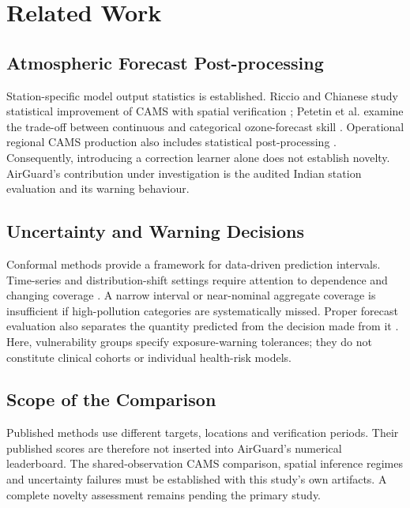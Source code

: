 \section{Related Work}
\subsection{Atmospheric Forecast Post-processing}
Station-specific model output statistics is established. Riccio and Chianese
study statistical improvement of CAMS with spatial verification
\cite{riccio2024mos}; Petetin et al. examine the trade-off between continuous
and categorical ozone-forecast skill \cite{petetin2022mos}. Operational
regional CAMS production also includes statistical post-processing
\cite{colette2025cams}. Consequently, introducing a correction learner alone
does not establish novelty. AirGuard's contribution under investigation is
the audited Indian station evaluation and its warning behaviour.

\subsection{Uncertainty and Warning Decisions}
Conformal methods provide a framework for data-driven prediction intervals.
Time-series and distribution-shift settings require attention to dependence
and changing coverage \cite{xu2021enbpi,gibbs2021aci}. A narrow interval or
near-nominal aggregate coverage is insufficient if high-pollution categories
are systematically missed. Proper forecast evaluation also separates the
quantity predicted from the decision made from it \cite{gneiting2007scoring}.
Here, vulnerability groups specify exposure-warning tolerances; they do not
constitute clinical cohorts or individual health-risk models.

\subsection{Scope of the Comparison}
Published methods use different targets, locations and verification periods.
Their published scores are therefore not inserted into AirGuard's numerical
leaderboard. The shared-observation CAMS comparison, spatial inference
regimes and uncertainty failures must be established with this study's own
artifacts. A complete novelty assessment remains pending the primary study.
